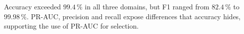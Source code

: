 \documentclass[10pt,twocolumn,a4paper]{article}
\newcommand{\pct}{\,\%}
\newcommand{\prauc}{PR-AUC}
\begin{document}
Accuracy exceeded $99.4\pct$ in all three domains, but F1 ranged from $82.4\pct$ to $99.98\pct$. \prauc{}, precision and recall expose differences that accuracy hides, supporting the use of \prauc{} for selection.
\newline
\newline
\newline
\newline
\newline
\newline
\newline
\newline
\newline
\newline
\newline
\newline
\newline
\newline
\newline
\newline
\newline
\newline
\newline
\newline
\newline
\newline
\newline
\newline
\newline
\newline
\newline
\newline
\newline
\newline
\newline
\newline
\newline
\newline
\newline
\newline
\newline
\end{document}
